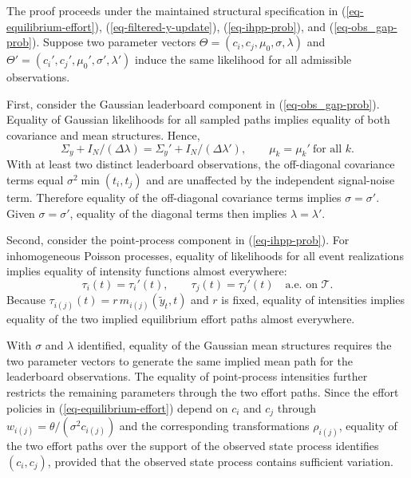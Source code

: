 \documentclass[mnsc]{informs3}
\begin{document}
\begin{APPENDICES}
The proof proceeds under the maintained structural specification in
(\ref{eq-equilibrium-effort}), (\ref{eq-filtered-y-update}),
(\ref{eq-ihpp-prob}), and (\ref{eq-obs_gap-prob}).
Suppose two parameter vectors $\Theta=(c_i,c_j,\mu_0,\sigma,\lambda)$ and
$\Theta'=(c_i',c_j',\mu_0',\sigma',\lambda')$ induce the same likelihood for all
admissible observations.

First, consider the Gaussian leaderboard component in (\ref{eq-obs_gap-prob}). 
Equality of Gaussian likelihoods for all sampled paths implies equality of both covariance and mean structures. 
Hence,
\begin{equation*}
\Sigma_y + I_N/(\Delta\lambda)
=
\Sigma_y' + I_N/(\Delta\lambda'),
\qquad
\mu_k=\mu_k'\ \text{for all } k.
\end{equation*}
With at least two distinct leaderboard observations, the off-diagonal covariance terms equal $\sigma^2\min(t_i,t_j)$ and are unaffected by the independent signal-noise term. 
Therefore equality of the off-diagonal covariance terms implies $\sigma=\sigma'$. Given $\sigma=\sigma'$, equality of the diagonal terms then implies $\lambda=\lambda'$.

Second, consider the point-process component in (\ref{eq-ihpp-prob}). 
For inhomogeneous Poisson processes, equality of likelihoods for all event realizations implies equality of intensity functions almost everywhere:
\begin{equation*}
\tau_i(t)=\tau_i'(t),
\qquad
\tau_j(t)=\tau_j'(t)
\quad
\text{a.e. on } \mathcal T.
\end{equation*}
Because $\tau_{i(j)}(t)=r\,m_{i(j)}(\tilde y_t,t)$ and $r$ is fixed, equality of intensities implies equality of the two implied equilibrium effort paths almost everywhere.

With $\sigma$ and $\lambda$ identified, equality of the Gaussian mean structures requires the two parameter vectors to generate the same implied mean path for the leaderboard observations. 
The equality of point-process intensities further restricts the remaining parameters through the two effort paths. 
Since the effort policies in (\ref{eq-equilibrium-effort}) depend on $c_i$ and $c_j$ through $w_{i(j)}=\theta/(\sigma^2c_{i(j)})$ and the corresponding transformations $\rho_{i(j)}$, equality of the two effort paths over the support of the observed state process identifies $(c_i,c_j)$, provided that the observed state process contains sufficient variation.


\end{APPENDICES}
\end{document}
